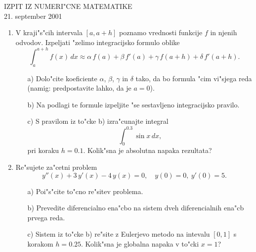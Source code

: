 \documentclass[12pt,a4paper]{article}
\begin{document}
\begin{center}
  IZPIT IZ NUMERI"CNE MATEMATIKE\\
  21. september 2001
\end{center}

\vspace{1.5cm}
\begin{enumerate}
 \item V kraji"s"cih intervala $[a,a+h]$ poznamo vrednosti 
    funkcije $f$ in njenih odvodov. Izpeljati "zelimo 
    integracijsko formulo oblike
    $$\int_{a}^{a+h} f(x)\,dx\approx \alpha\,f(a)+
    \beta\,f'(a)+\gamma\,f(a+h)+\delta\,f'(a+h).$$
  \begin{itemize}
    \item[a)] Dolo"cite koeficiente $\alpha$, $\beta$, $\gamma$
      in $\delta$ tako, da bo formula "cim vi"sjega reda (namig:
      predpostavite lahko, da je $a=0$).
    \item[b)] Na podlagi te formule izpeljite "se 
      sestavljeno integracijsko pravilo.
    \item[c)] S pravilom iz to"cke b) izra"cunajte integral
      $$\int_{0}^{0.3} \sin{x}\,dx,$$
      pri koraku $h=0.1$. Kolik"sna je absolutna napaka rezultata?
  \end{itemize}

 \item Re"sujete za"cetni problem
    $$y''(x)+3\,y'(x)-4\,y(x)=0,\quad y(0)=0,\ y'(0)=5.$$
  \begin{itemize}
     \item[a)] Poi"s"cite to"cno re"sitev problema.
     \item[b)] Prevedite diferencialno ena"cbo na sistem dveh
       diferencialnih ena"cb prvega reda.
     \item[c)] Sistem iz to"cke b) re"site z Eulerjevo metodo
       na intevalu $[0,1]$ s korakom $h=0.25$. Kolik"sna je
       globalna napaka v to"cki $x=1$?
     \end{itemize}
\end{enumerate}
\end{document}
